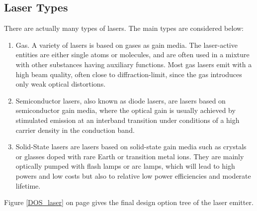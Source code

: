 \subsection{Laser Types}
	\label{blDOLSRtypes}
There are actually many types of \acs{laser}s. The main types are considered below:
\begin{enumerate}
	\item Gas. A variety of \acs{laser}s is based on gases as gain media. The \acs{laser}-active entities are either single atoms or molecules, and are often used in a mixture with other substances having auxiliary functions. Most gas lasers emit with a high beam quality, often close to diffraction-limit, since the gas introduces only weak optical distortions.
	\item Semiconductor \acs{laser}s, also known as diode \acs{laser}s, are \acs{laser}s based on semiconductor gain media, where the optical gain is usually achieved by stimulated emission at an interband transition under conditions of a high carrier density in the conduction band.  
	\item Solid-State \acs{laser}s are \acs{laser}s based on solid-state gain media such as crystals or glasses doped with rare Earth or transition metal ions. They are mainly optically pumped with flash lamps or arc lamps, which will lead to high powers and low costs but also to relative low power efficiencies and moderate lifetime. \cite{lasertech}
\end{enumerate} 
Figure \ref{DOS_laser} on page \pageref{DOS_laser} gives the final design option tree of the laser emitter.
